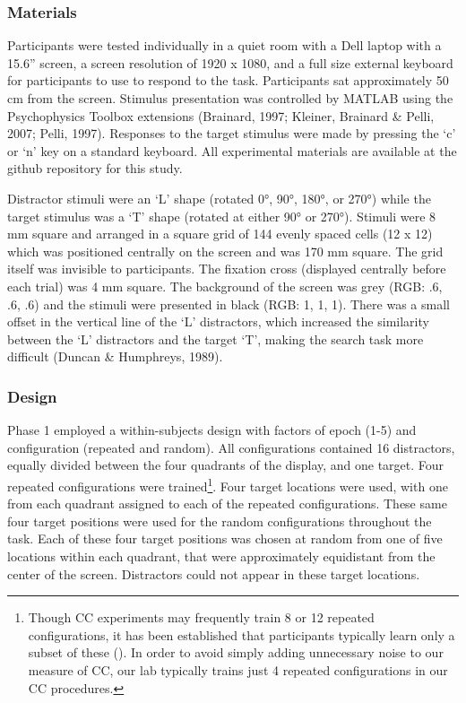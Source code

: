 \documentclass[
  man,
  floatsintext,
  longtable,
  nolmodern,
  notxfonts,
  notimes,
  colorlinks=true,linkcolor=blue,citecolor=blue,urlcolor=blue]{apa7}
\begin{document}
\subsubsection{Materials}\label{materials}

Participants were tested individually in a quiet room with a Dell laptop
with a 15.6'' screen, a screen resolution of 1920 x 1080, and a full
size external keyboard for participants to use to respond to the task.
Participants sat approximately 50 cm from the screen. Stimulus
presentation was controlled by MATLAB using the Psychophysics Toolbox
extensions (Brainard, 1997; Kleiner, Brainard \& Pelli, 2007; Pelli,
1997). Responses to the target stimulus were made by pressing the `c' or
`n' key on a standard keyboard. All experimental materials are available
at the github repository for this study.

Distractor stimuli were an `L' shape (rotated 0°, 90°, 180°, or 270°)
while the target stimulus was a `T' shape (rotated at either 90° or
270°). Stimuli were 8 mm square and arranged in a square grid of 144
evenly spaced cells (12 x 12) which was positioned centrally on the
screen and was 170 mm square. The grid itself was invisible to
participants. The fixation cross (displayed centrally before each trial)
was 4 mm square. The background of the screen was grey (RGB: .6, .6, .6)
and the stimuli were presented in black (RGB: 1, 1, 1). There was a
small offset in the vertical line of the `L' distractors, which
increased the similarity between the `L' distractors and the target `T',
making the search task more difficult (Duncan \& Humphreys, 1989).

\subsubsection{Design}\label{design}

Phase 1 employed a within-subjects design with factors of epoch (1-5)
and configuration (repeated and random). All configurations contained 16
distractors, equally divided between the four quadrants of the display,
and one target. Four repeated configurations were trained\footnote{Though
  CC experiments may frequently train 8 or 12 repeated configurations,
  it has been established that participants typically learn only a
  subset of these (). In
  order to avoid simply adding unnecessary noise to our measure of CC,
  our lab typically trains just 4 repeated configurations in our CC
  procedures.}. Four target locations were used, with one from each
quadrant assigned to each of the repeated configurations. These same
four target positions were used for the random configurations throughout
the task. Each of these four target positions was chosen at random from
one of five locations within each quadrant, that were approximately
equidistant from the center of the screen. Distractors could not appear
in these target locations.
\end{document}
